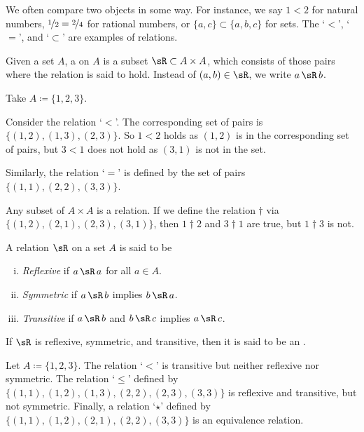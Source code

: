 We often compare two objects in some way.  For instance, we say $1 < 2$
for natural numbers, $\nicefrac{1}{2} = \nicefrac{2}{4}$ for rational
numbers, or $\{ a,c \} \subset \{ a,b,c \}$ for sets.  The `$<$', `$=$', and
`$\subset$' are examples of
relations.

\begin{defn}
Given a set $A$, a \emph{} on $A$
is a subset $\sR \subset A \times A$,
which consists of those pairs where the relation is said to hold.
Instead of $(a,b) \in \sR$, we write
$a \, \sR \, b$.
\end{defn}

\begin{example}
Take $A \coloneqq \{ 1,2,3 \}$.

Consider the relation `$<$'.  The corresponding set 
of pairs is $\bigl\{ (1,2), (1,3), (2,3) \bigr\}$.  So $1 < 2$ holds as $(1,2)$
is in the corresponding set of pairs, but $3 < 1$ does not hold as $(3,1)$ is
not in the set.

Similarly, the relation `$=$'
is defined by the set of pairs $\bigl\{ (1,1), (2,2), (3,3) \big\}$.

Any subset of $A \times A$ is a relation.  If we define the relation
$\dagger$ via $\bigl\{ (1,2), (2,1), (2,3), (3,1) \bigr\}$, then $1 \dagger 2$ and
$3 \dagger 1$ are
true, but $1 \dagger 3$ is not.
\end{example}

\begin{defn}
\pagebreak[2]
A relation
$\sR$ on a set $A$ is said to be
\begin{enumerate}[(i)]
\item
\emph{Reflexive} if $a\, \sR \, a$ for
all $a \in A$.
\item
\emph{Symmetric} if $a\, \sR \, b$ implies
$b \, \sR \, a$.
\item
\emph{Transitive} if $a\, \sR \, b$ and
$b \, \sR \, c$ implies $a\, \sR \, c$.
\end{enumerate}
If $\sR$ is reflexive, symmetric, and transitive, then it is said to be
an \emph{}.
\end{defn}

\begin{example}
Let $A \coloneqq \{ 1,2,3 \}$.
The relation `$<$' is transitive but neither reflexive nor symmetric.  The
relation `$\leq$' defined by
$\bigl\{ (1,1), (1,2), (1,3), (2,2), (2,3), (3,3) \bigr\}$
is reflexive and transitive, but not symmetric.
Finally, a relation `$\star$' defined by
$\bigl\{ (1,1), (1,2), \allowbreak (2,1), \allowbreak (2,2), \allowbreak (3,3) \bigr\}$ is
an equivalence relation.
\end{example}

